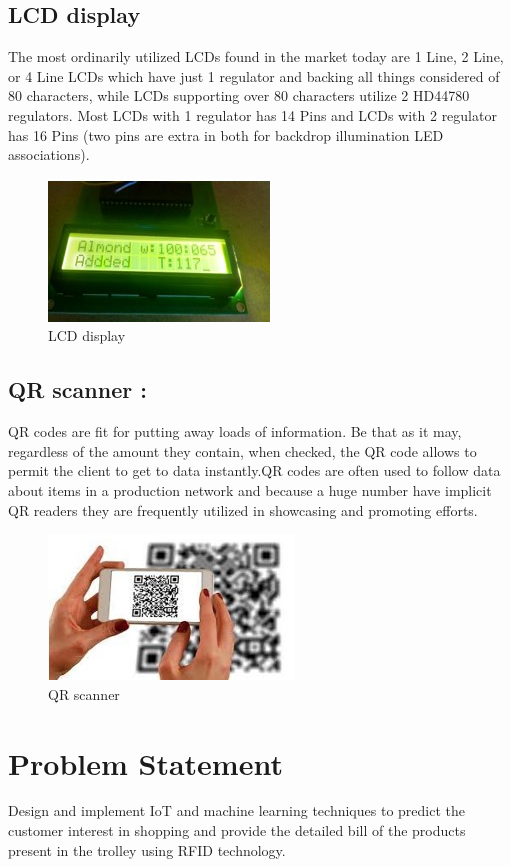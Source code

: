 \documentclass[conference]{IEEEtran}
\begin{document}
\subsection{LCD display}
The most ordinarily utilized LCDs found in the market today are 1 Line, 2 Line, or 4 Line LCDs which have just 1 regulator and backing all things considered of 80 characters, while LCDs supporting over 80 characters utilize 2 HD44780 regulators. Most LCDs with 1 regulator has 14 Pins and LCDs with 2 regulator has 16 Pins (two pins are extra in both for backdrop illumination LED associations)\cite{b2}.
\begin{figure}[htbp]
	\centerline{\includegraphics{LCD}}
	\caption{LCD display}
	\label{fig}
\end{figure}
\subsection{QR scanner :}
QR codes are fit for putting away loads of information. Be that as it may, regardless of the amount they contain, when checked, the QR code allows to permit the client to get to data instantly\cite{b2}.QR codes are often used to follow data about items in a production network and because a huge number have implicit QR readers they are frequently utilized in showcasing and promoting efforts.
\begin{figure}[htbp]
	\centerline{\includegraphics{Scanner}}
	\caption{QR scanner}
	\label{fig}
\end{figure}
\section{Problem Statement}
	Design and implement IoT and machine learning techniques to predict the customer interest in shopping and provide the detailed bill of the products present in the trolley using RFID technology. 
	
\end{document}
